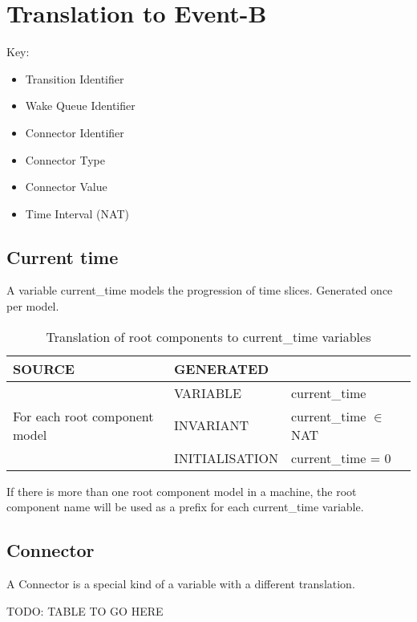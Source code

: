 \section{Translation to Event-B}
\label{sec:component_diagrams-translation}



Key:
\begin{itemize}
\item Transition Identifier
\item Wake Queue Identifier
\item Connector Identifier
\item Connector Type
\item Connector Value
\item Time Interval (NAT)
\end{itemize}


\subsection{Current time}

A variable current\_time models the progression of time slices.  Generated once per model.
 
\begin{table}[htbp]
\centering
\begin{tabular}{|l|l|l|}
\hline
SOURCE & \multicolumn{2}{l|}{GENERATED} \\ \hline
\multirow{3}{*}{For each root component model} & VARIABLE & current\_time \\ \cline{2-3} 
 & INVARIANT & current\_time $\in$ NAT\\ \cline{2-3} 
 & INITIALISATION & current\_time = 0 \\ \hline
\end{tabular}
\caption{Translation of root components to current\_time variables}
\label{transaltion-CurrentTime}
\end{table}
 
If there is more than one root component model in a machine, the root component name will be used as a prefix for each current\_time variable.

\subsection{Connector}
 
A Connector is a special kind of a variable with a different translation. 
 
TODO: TABLE TO GO HERE

